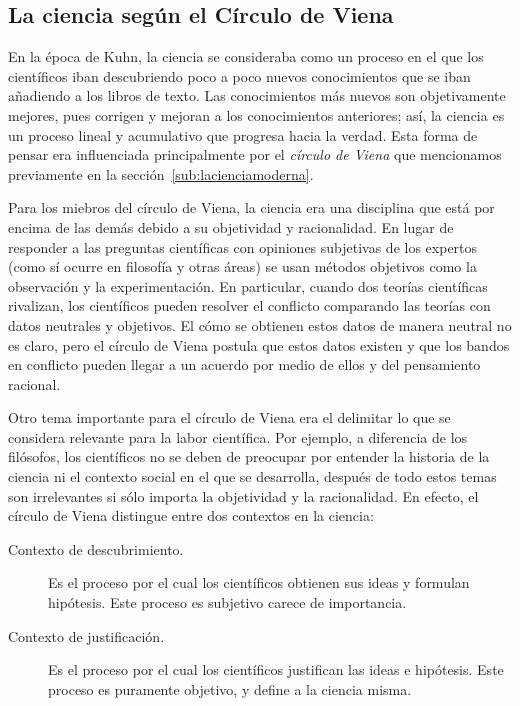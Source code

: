 \subsection*{La ciencia según el Círculo de Viena}
\label{sub:circulodeviena}
En la época de Kuhn, la ciencia se consideraba como un proceso en el que los
científicos iban descubriendo poco a poco nuevos conocimientos que se iban
añadiendo a los libros de texto.
Las conocimientos más nuevos son objetivamente mejores, pues corrigen y mejoran
a los conocimientos anteriores; así, la ciencia es un proceso lineal y
acumulativo que progresa hacia la verdad.
Esta forma de pensar era influenciada principalmente por el \emph{círculo de
    Viena} que mencionamos previamente en la sección~\ref{sub:lacienciamoderna}.

Para los miebros del círculo de Viena, la ciencia era una disciplina que está
por encima de las demás debido a su objetividad y racionalidad.
En lugar de responder a las preguntas científicas con opiniones subjetivas de
los expertos (como sí ocurre en filosofía y otras áreas) se usan métodos
objetivos como la observación y la experimentación.
En particular, cuando dos teorías científicas rivalizan, los científicos pueden
resolver el conflicto comparando las teorías con datos neutrales y objetivos.
El cómo se obtienen estos datos de manera neutral no es claro, pero el círculo
de Viena postula que estos datos existen y que los bandos en conflicto pueden
llegar a un acuerdo por medio de ellos y del pensamiento racional.

Otro tema importante para el círculo de Viena era el delimitar lo que se
considera relevante para la labor científica.
Por ejemplo, a diferencia de los filósofos, los científicos no se deben de
preocupar por entender la historia de la ciencia ni el contexto social en el que
se desarrolla, después de todo estos temas son irrelevantes si sólo importa la
objetividad y la racionalidad.
En efecto, el círculo de Viena distingue entre dos contextos en la ciencia:
\begin{description}
    \item[Contexto de descubrimiento.] Es el proceso por el cual los científicos
          obtienen sus ideas y formulan hipótesis.
          Este proceso es subjetivo carece de importancia.
    \item[Contexto de justificación.] Es el proceso por el cual los científicos
          justifican las ideas e hipótesis.
          Este proceso es puramente objetivo, y define a la ciencia misma.
\end{description}


